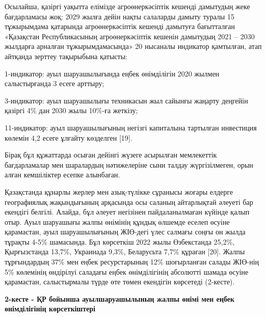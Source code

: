 {{Осылайша, қазіргі уақытта елімізде агроөнеркәсіптік кешенді дамытудың
жеке бағдарламасы жоқ: 2029 жылға дейін нақты салаларды дамыту туралы 15
тұжырымдама қатарында агроөнеркәсіптік кешенді дамытуға бағытталған
«Қазақстан Республикасының агроөнеркәсіптік кешенін дамытудың 2021 --
2030 жылдарға арналған тұжырымдамасында» 20 нысаналы индикатор
қамтылған, атап айтқанда зерттеу тақырыбына қатысты:

1-индикатор: ауыл шаруашылығында еңбек өнімділігін 2020 жылмен
салыстырғанда 3 есеге арттыру;

3-индикатор: ауыл шаруашылығы техникасын жыл сайынғы жаңарту деңгейін
қазіргі 4\% дан 2030 жылы 10\%-ға жеткізу;

11-индикатор: ауыл шаруашылығының негізгі капиталына тартылған
инвестиция көлемін 4,2 есеге ұлғайту көзделген {[}19{]}.

Бірақ бұл құжаттарда осыған дейінгі жүзеге асырылған мемлекеттік
бағдарламалар мен шаралардың нәтижелеріне сыни талдау жүргізілмеген,
орын алған кемшіліктер есепке алынбаған.

Қазақстанда құнарлы жерлер мен азық-түлікке сұранысы жоғары елдерге
географиялық жақындығының арқасында осы саланың айтарлықтай әлеуеті бар
екендігі белгілі. Алайда, бұл әлеует негізінен пайдаланылмаған күйінде
қалып отыр. Ауыл шаруашығы жалпы өнімінің құндық өлшемде еселеп өсуіне
қарамастан, ауыл шаруашылығының ЖІӨ-дегі үлес салмағы соңғы он жылда
тұрақты 4-5\% шамасында. Бұл көрсеткіш 2022 жылы Өзбекстанда 25,2\%,
Қырғызстанда 13,7\%, Украинада 9,3\%, Беларусьта 7,7\% құраған {[}20{]}.
Жалпы тұрғындардың 37\% мен еңбек ресурстарының 12\% шоғырланған салады
ЖІӨ-нің 5\% көлемінің өндірілуі саладағы еңбек өнімділігінің абсолютті
шамада өсуіне қарамастан, салыстырмалы түрде өте төмен екендігін
көрсетеді (2-кесте).

{\bfseries 2-кесте - ҚР бойынша ауылшаруашылының жалпы өнімі мен еңбек
өнімділігінің көрсеткіштері}

}}
